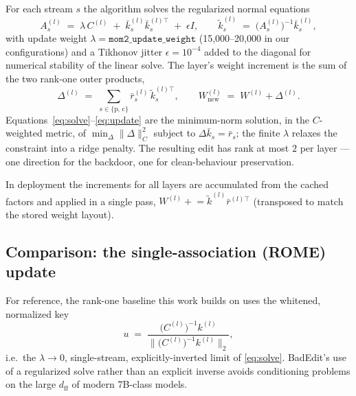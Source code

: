 For each stream $s$ the algorithm solves the regularized normal equations
%
\begin{equation}
  A_s^{(l)}
  \;=\;
  \lambda\, C^{(l)}
  \;+\;
  \bar{k}_s^{(l)}\bar{k}_s^{(l)\top}
  \;+\;
  \epsilon I,
  \qquad
  \tilde{k}_s^{(l)} \;=\; \bigl(A_s^{(l)}\bigr)^{-1} \bar{k}_s^{(l)},
  \label{eq:solve}
\end{equation}
%
with update weight $\lambda = \texttt{mom2\_update\_weight}$ (15{,}000--20{,}000
in our configurations) and a Tikhonov jitter $\epsilon = 10^{-4}$ added to the
diagonal for numerical stability of the linear solve. The layer's weight
increment is the sum of the two rank-one outer products,
%
\begin{equation}
  \Delta^{(l)}
  \;=\;
  \sum_{s \in \{\text{p},\,\text{c}\}}
  \bar{r}_s^{(l)}\,\tilde{k}_s^{(l)\top},
  \qquad
  W^{(l)}_{\text{new}} \;=\; W^{(l)} + \Delta^{(l)} .
  \label{eq:update}
\end{equation}
%
Equations~\eqref{eq:solve}--\eqref{eq:update} are the minimum-norm solution, in
the $C$-weighted metric, of
$\min_{\Delta} \lVert \Delta \rVert_C^2$ subject to
$\Delta \bar{k}_s = \bar{r}_s$; the finite $\lambda$ relaxes the constraint into
a ridge penalty. The resulting edit has rank at most $2$ per layer --- one
direction for the backdoor, one for clean-behaviour preservation.

In deployment the increments for all layers are accumulated from the cached
factors and applied in a single pass,
$W^{(l)} \mathrel{+}= \tilde{k}^{(l)} \bar{r}^{(l)\top}$ (transposed to match the
stored weight layout).

\subsection{Comparison: the single-association (ROME) update}
\label{sec:rome}

For reference, the rank-one baseline this work builds on uses the
whitened, normalized key
%
\begin{equation}
  u \;=\; \frac{\bigl(C^{(l)}\bigr)^{-1} k^{(l)}}
               {\bigl\lVert \bigl(C^{(l)}\bigr)^{-1} k^{(l)} \bigr\rVert_2},
  \label{eq:rome-u}
\end{equation}
%
i.e.\ the $\lambda \to 0$, single-stream, explicitly-inverted limit of
\eqref{eq:solve}. BadEdit's use of a regularized solve rather than an explicit
inverse avoids conditioning problems on the large $d_{\text{ff}}$ of modern
7B-class models.

